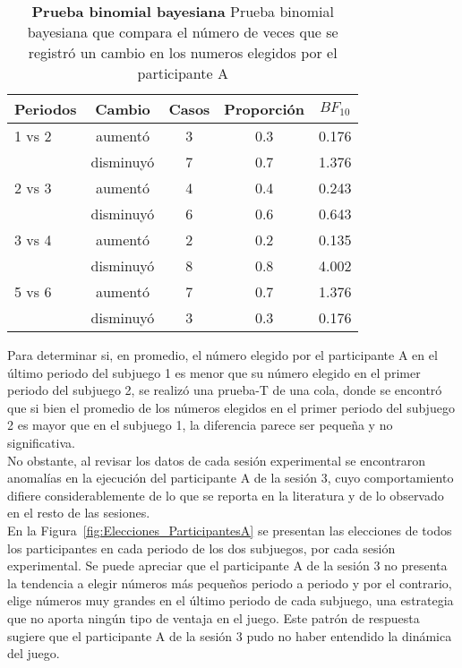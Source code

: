 \begin{table}[h]
\caption[Prueba binomial bayesiana para evaluar la proporción de casos en que los participantes A reducen su número elegido]{\textbf{Prueba binomial bayesiana} Prueba binomial bayesiana que compara el número de veces que se registró un cambio en los numeros elegidos por el participante A}
\label{Binom_Reset}
\centering
\begin{tabular}{l c | c c | c}
\toprule
\textbf{Periodos} & \textbf{Cambio} & \textbf{Casos} & \textbf{Proporción} & \textbf{$BF_{10}$}\\
\midrule
1 vs 2 & aumentó & 3 & 0.3 & 0.176\\
       & disminuyó & 7 & 0.7 & 1.376\\
2 vs 3 & aumentó & 4 & 0.4 & 0.243\\
       & disminuyó & 6 & 0.6 & 0.643\\
3 vs 4 & aumentó & 2 & 0.2 & 0.135\\
       & disminuyó & 8 & 0.8 & 4.002\\
5 vs 6 & aumentó & 7 & 0.7 & 1.376\\
       & disminuyó & 3 & 0.3 & 0.176\\
\bottomrule
\end{tabular}
\end{table}

Para determinar si, en promedio, el número elegido por el participante A en el último periodo del subjuego 1 es menor que su número elegido en el primer periodo del subjuego 2, se realizó una prueba-T de una cola, donde se encontró que si bien el promedio de los números elegidos en el primer periodo del subjuego 2 es mayor que en el subjuego 1, la diferencia parece ser pequeña y no significativa.\\

No obstante, al revisar los datos de cada sesión experimental se encontraron anomalías en la ejecución del participante A de la sesión 3, cuyo comportamiento difiere considerablemente de lo que se reporta en la literatura y de lo observado en el resto de las sesiones.\\

En la Figura~\ref{fig:Elecciones_ParticipantesA} se presentan las elecciones de todos los participantes en cada periodo de los dos subjuegos, por cada sesión experimental. Se puede apreciar que el participante A de la sesión 3 no presenta la tendencia a elegir números más pequeños periodo a periodo y por el contrario, elige números muy grandes en el último periodo de cada subjuego, una estrategia que no aporta ningún tipo de ventaja en el juego. Este patrón de respuesta sugiere que el participante A de la sesión 3 pudo no haber entendido la dinámica del juego.\\

